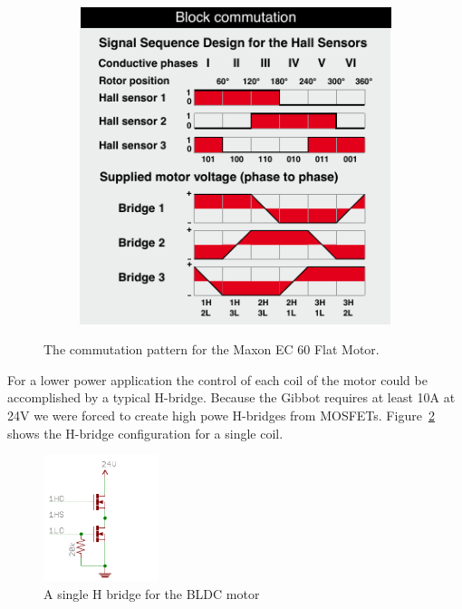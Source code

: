 \documentclass{article}
\begin{document}
\begin{figure}[h]
\begin{subfigure}{0.4\textwidth}
		\includegraphics[width=\textwidth]{commutation2}
		\caption{}
	\end{subfigure}
	\caption{The commutation pattern for the Maxon EC 60 Flat Motor.\protect\footnotemark}
	\label{fig:commutation}
\end{figure}

For a lower power application the control of each coil of the motor could be accomplished by a typical H-bridge. Because the Gibbot requires at least 10A at 24V we were forced to create high powe H-bridges from MOSFETs.  Figure~\ref{fig:hbridge} shows the H-bridge configuration for a single coil. 
\begin{figure}[h]
	\centering
	\includegraphics[width=0.3\textwidth]{hbridge}
	\caption{A single H bridge for the BLDC motor}
	\label{fig:hbridge}
\end{figure}
\end{document}
